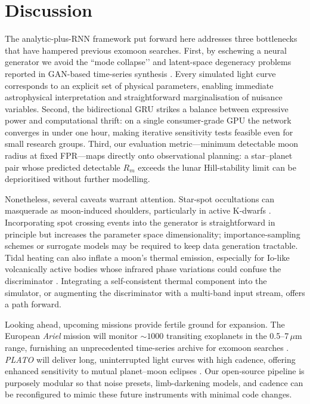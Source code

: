 \documentclass[11pt]{article}
\begin{document}
\section{Discussion}
\label{sec:discussion}
The analytic-plus-RNN framework put forward here addresses three bottlenecks that have hampered previous exomoon searches.  First, by eschewing a neural generator we avoid the ``mode collapse’’ and latent-space degeneracy problems reported in GAN-based time-series synthesis \citep{Yoon2019,Liu2024}.  Every simulated light curve corresponds to an explicit set of physical parameters, enabling immediate astrophysical interpretation and straightforward marginalisation of nuisance variables.  Second, the bidirectional GRU strikes a balance between expressive power and computational thrift: on a single consumer-grade GPU the network converges in under one hour, making iterative sensitivity tests feasible even for small research groups.  Third, our evaluation metric—minimum detectable moon radius at fixed FPR—maps directly onto observational planning: a star–planet pair whose predicted detectable $R_{m}$ exceeds the lunar Hill-stability limit can be deprioritised without further modelling.

Nonetheless, several caveats warrant attention.  Star-spot occultations can masquerade as moon-induced shoulders, particularly in active K-dwarfs \citep{Akinsanmi2018}.  Incorporating spot crossing events into the generator is straightforward in principle but increases the parameter space dimensionality; importance-sampling schemes or surrogate models may be required to keep data generation tractable.  Tidal heating can also inflate a moon’s thermal emission, especially for Io-like volcanically active bodies whose infrared phase variations could confuse the discriminator \citep{Kleisioti2024}.  Integrating a self-consistent thermal component into the simulator, or augmenting the discriminator with a multi-band input stream, offers a path forward.  

Looking ahead, upcoming missions provide fertile ground for expansion.  The European \textit{Ariel} mission will monitor $\sim\!1000$ transiting exoplanets in the 0.5–7\,$\mu$m range, furnishing an unprecedented time-series archive for exomoon searches \citep{ArielFacts2022}.  \textit{PLATO} will deliver long, uninterrupted light curves with high cadence, offering enhanced sensitivity to mutual planet–moon eclipses \citep{PLATOObjectives2018}.  Our open-source pipeline is purposely modular so that noise presets, limb-darkening models, and cadence can be reconfigured to mimic these future instruments with minimal code changes.
\end{document}
